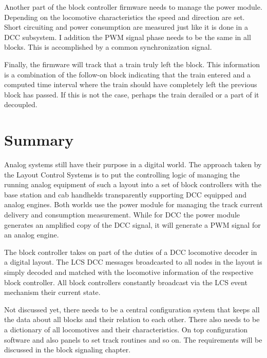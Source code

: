 Another part of the block controller firmware needs to manage the power module. Depending on the locomotive characteristics the speed and direction are set. Short circuiting and power consumption are measured just like it is done in a DCC subsystem. I addition the PWM signal phase needs to be the same in all blocks. This is accomplished by a common synchronization signal.

Finally, the firmware will track that a train truly left the block. This information is a combination of the follow-on block indicating that the train entered and a computed time interval where the train should have completely left the previous block has passed. If this is not the case, perhaps the train derailed or a part of it decoupled.

\section{Summary}

Analog systems still have their purpose in a digital world. The approach taken by the Layout Control Systems is to put the controlling logic of managing the running analog equipment of such a layout into a set of block controllers with the base station and cab handhelds transparently supporting DCC equipped and analog engines. Both worlds use the power module for managing the track current delivery and consumption measurement. While for DCC the power module generates an amplified copy of the DCC signal, it will generate a PWM signal for an analog engine.

The block controller takes on part of the duties of a DCC locomotive decoder in a digital layout. The LCS DCC messages broadcasted to all nodes in the layout is simply decoded and matched with the locomotive information of the respective block controller. All block controllers constantly broadcast via the LCS event mechanism their current state.

Not discussed yet, there needs to be a central configuration system that keeps all the data about all blocks and their relation to each other. There also needs to be a dictionary of all locomotives and their characteristics. On top configuration software and also panels to set track routines and so on. The requirements will be discussed in the block signaling chapter.
